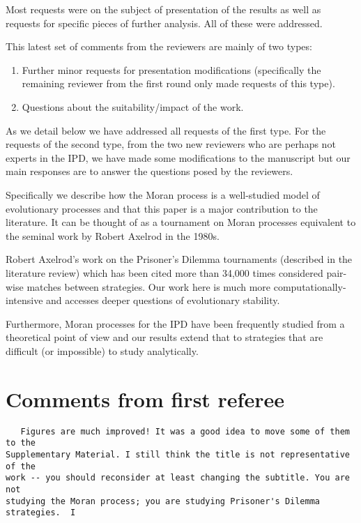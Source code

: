 \documentclass[a4]{article}
\begin{document}
Most requests were on the subject of
presentation of the results as well as requests for specific pieces of further
analysis. All of these were addressed.

This latest set of comments from the reviewers are mainly of two types:

\begin{enumerate}
    \item Further minor requests for presentation modifications (specifically
        the remaining reviewer from the first round only made requests of this
        type).
    \item Questions about the suitability/impact of the work.
\end{enumerate}

As we detail below we have addressed all requests of the first type. For the
requests of the second type, from the two new reviewers who are perhaps not
experts in the IPD, we have made some modifications to the manuscript but our
main responses are to answer the questions posed by the reviewers.

Specifically we describe how the Moran process is a well-studied model of
evolutionary processes and that this paper is a major contribution to the
literature. It can be thought of as a tournament on Moran processes equivalent
to the seminal work by Robert Axelrod in the 1980s.

Robert Axelrod's work on the Prisoner's Dilemma tournaments (described in the
literature review) which has been cited more than 34,000 times considered
pair-wise matches between strategies. Our work here is much more
computationally-intensive and accesses deeper questions of evolutionary
stability.

Furthermore, Moran processes for the IPD have been frequently studied from a
theoretical point of view and our results extend that to strategies that are
difficult (or impossible) to study analytically.

\section{Comments from first referee}

\begin{verbatim}
   Figures are much improved! It was a good idea to move some of them to the
Supplementary Material. I still think the title is not representative of the
work -- you should reconsider at least changing the subtitle. You are not
studying the Moran process; you are studying Prisoner's Dilemma strategies.  I
\end{verbatim}
\end{document}
